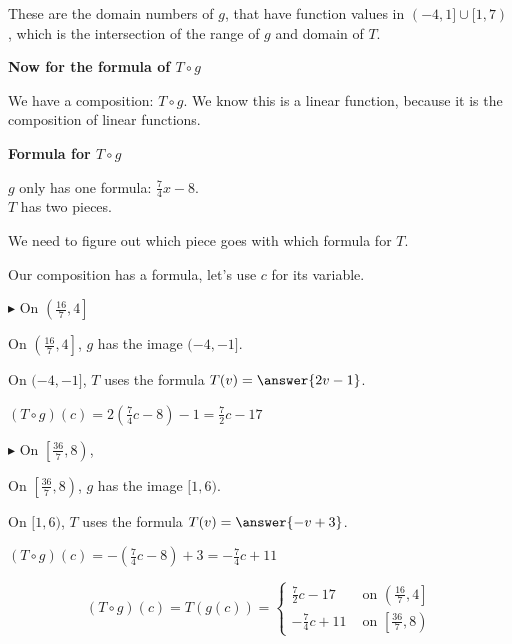 \documentclass{ximera}
\begin{document}
These are the domain numbers of $g$, that have function values in $(-4,1] \cup [1,7)$, which is the intersection of the range of $g$ and domain of $T$.


\textbf{\textcolor{blue!55!black}{Now for the formula of $T \circ g$}}



We have a composition: $T \circ g$.  We know this is a linear function, because it is the composition of linear functions. 



\begin{explanation}  \textbf{\textcolor{red!75!green}{Formula for $T \circ g$}} 


$g$ only has one formula:  $\frac{7}{4}x - 8$.\\
$T$ has two pieces.

We need to figure out which piece goes with which formula for $T$.


Our composition has a formula, let's use $c$ for its variable. 


$\blacktriangleright$ On $\left( \frac{16}{7}, 4 \right]$ 


On $\left( \frac{16}{7}, 4 \right]$, $g$ has the image $(-4, -1]$.


On $(-4, -1]$, $T$ uses the formula $T(v) = \answer{2v - 1}$.  



$(T \circ g)(c) = 2\left( \frac{7}{4}c - 8 \right) - 1 = \frac{7}{2}c - 17$ 





$\blacktriangleright$ On $\left[ \frac{36}{7}, 8 \right)$,  

On $\left[ \frac{36}{7}, 8 \right)$, $g$ has the image $[1, 6)$.


On $[1, 6)$, $T$ uses the formula $T(v) = \answer{-v + 3}$.  




$(T \circ g)(c) = -\left(\frac{7}{4}c - 8\right) + 3 = -\frac{7}{4}c + 11$










\[
(T \circ g)(c) = T(g(c)) = 
\begin{cases}
  \frac{7}{2}c - 17     &     \text{ on }  \left(\frac{16}{7}, 4\right] \\
  -\frac{7}{4}c + 11   &     \text{ on }  \left[\frac{36}{7}, 8\right)
\end{cases}
\]




\end{explanation}
\end{document}
